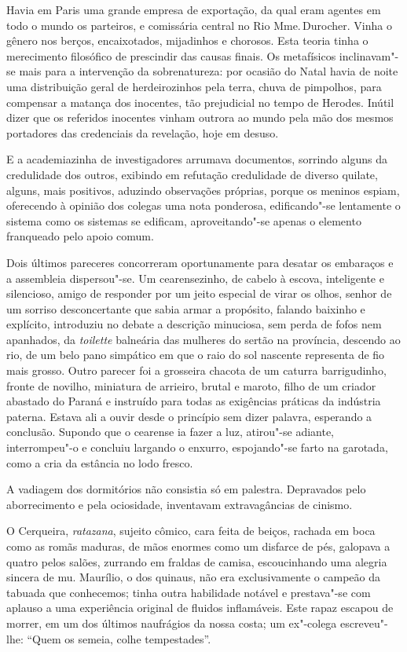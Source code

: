Havia em Paris uma grande empresa de exportação, da qual eram agentes
em todo o mundo os parteiros, e comissária central no Rio Mme.\,Durocher. 
Vinha o gênero nos berços, encaixotados, mijadinhos e chorosos. Esta teoria 
tinha o merecimento filosófico de prescindir das causas finais. Os metafísicos
inclinavam"-se mais para a intervenção da sobrenatureza: por ocasião
do Natal havia de noite uma distribuição geral de herdeirozinhos pela
terra, chuva de pimpolhos, para compensar a matança dos inocentes, tão
prejudicial no tempo de Herodes. Inútil dizer que os referidos
inocentes vinham outrora ao mundo pela mão dos mesmos portadores das
credenciais da revelação, hoje em desuso. 

E a academiazinha de
investigadores arrumava documentos, sorrindo alguns da credulidade dos
outros, exibindo em refutação credulidade de diverso quilate, alguns,
mais positivos, aduzindo observações próprias, porque os meninos
espiam, oferecendo à opinião dos colegas uma nota ponderosa,
edificando"-se lentamente o sistema como os sistemas se edificam,
aproveitando"-se apenas o elemento franqueado pelo apoio comum. 

Dois últimos pareceres concorreram oportunamente para desatar os embaraços e
a assembleia dispersou"-se. Um cearensezinho, de cabelo à escova,
inteligente e silencioso, amigo de responder por um jeito especial de
virar os olhos, senhor de um sorriso desconcertante que sabia armar a
propósito, falando baixinho e explícito, introduziu no debate a
descrição minuciosa, sem perda de fofos nem apanhados, da \textit{toilette}
balneária das mulheres do sertão na província, descendo ao rio, de um
belo pano simpático em que o raio do sol nascente representa de fio
mais grosso. Outro parecer foi a grosseira chacota de um caturra
barrigudinho, fronte de novilho, miniatura de arrieiro, brutal e
maroto, filho de um criador abastado do Paraná e instruído para todas
as exigências práticas da indústria paterna. Estava ali a ouvir desde o
princípio sem dizer palavra, esperando a conclusão. Supondo que o
cearense ia fazer a luz, atirou"-se adiante, interrompeu"-o e
concluiu largando o enxurro, espojando"-se farto na garotada, como a
cria da estância no lodo fresco. 

A vadiagem dos dormitórios não
consistia só em palestra. Depravados pelo aborrecimento e pela
ociosidade, inventavam extravagâncias de cinismo. 

O Cerqueira, \textit{ratazana}, sujeito cômico, cara feita de beiços, rachada em boca como as
romãs maduras, de mãos enormes como um disfarce de pés, galopava a
quatro pelos salões, zurrando em fraldas de camisa, escoucinhando uma
alegria sincera de mu. Maurílio, o dos quinaus, não era exclusivamente
o campeão da tabuada que conhecemos; tinha outra habilidade notável e
prestava"-se com aplauso a uma experiência original de fluidos
inflamáveis. Este rapaz escapou de morrer, em um dos últimos naufrágios
da nossa costa; um ex"-colega escreveu"-lhe: ``Quem os semeia, colhe
tempestades''. 

